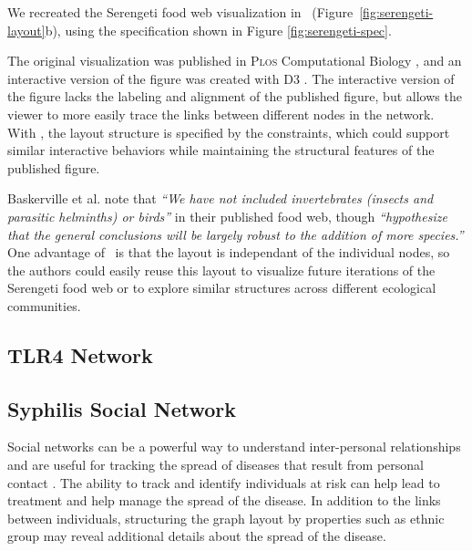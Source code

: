 We recreated the Serengeti food web visualization in \projectname~(Figure~\ref{fig:serengeti-layout}b), using the specification shown in Figure \ref{fig:serengeti-spec}.  

The original visualization was published in \textsc{Plos} Computational Biology \cite{baskerville2011spatial}, and an interactive version of the figure was created with D3 \cite{baskerville2011interactive}. The interactive version of the figure lacks the labeling and alignment of the published figure, but allows the viewer to more easily trace the links between different nodes in the network. With \projectname, the layout structure is specified by the constraints, which could support similar interactive behaviors while maintaining the structural features of the published figure.

Baskerville et al. note that \emph{``We have not included invertebrates (insects and parasitic helminths) or birds''} in their published food web, though \emph{``hypothesize that the general conclusions will be largely robust to the addition of more species.''} One advantage of \projectname~is that the layout is independant of the individual nodes, so the authors could easily reuse this layout to visualize future iterations of the Serengeti food web or to explore similar structures across different ecological communities.

\subsection{TLR4 Network}


\subsection{Syphilis Social Network}
\syphilisLayout
\syphilisSpec

Social networks can be a powerful way to understand inter-personal relationships and are useful for tracking the spread of diseases that result from personal contact \cite{rothenberg1998using} . The ability to track and identify individuals at risk can help lead to treatment and help manage the spread of the disease. In addition to the links between individuals, structuring the graph layout by properties such as ethnic group may reveal additional details about the spread of the disease.

